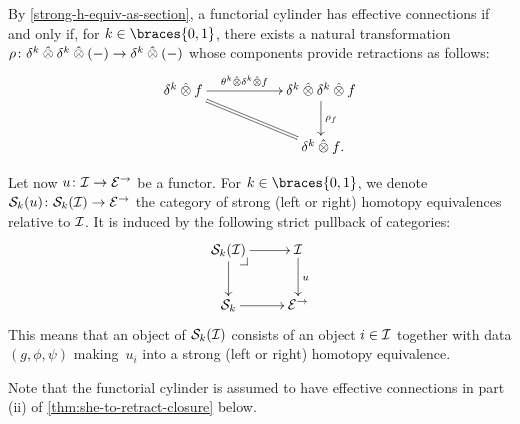 \documentclass[reqno,10pt,a4paper,oneside]{amsart}
\begin{document}
\begin{remark} \label{thm:retraction-for-connections}
By \cref{strong-h-equiv-as-section}, a functorial cylinder has effective connections if and only if, for $k \in \braces{0, 1}$, there exists a natural transformation $\rho \co \kcyl \hatotimes \kcyl \hatotimes (-) \to \kcyl \hatotimes (-)$ whose components provide retractions as follows:
\begin{gather*}
\xymatrix@C+3em{
  \kcyl \hatotimes f
  \ar[r]^-{\thetak \hatotimes \kcyl \hatotimes f}
  \ar@{=}[dr]
&
  \kcyl \hatotimes \kcyl \hatotimes f
  \ar[d]^{\rho_f}
\\&
  \kcyl \hatotimes f
\rlap{.}}
\end{gather*}
\end{remark}


Let now $u \co \cal{I} \to \catE^\to$ be a functor.
For $k \in \braces{0, 1}$, we denote $\cal{S}_k(u) \co \cal{S}_k(\cal{I}) \to \catE^\to$ the category of strong (left or right) homotopy equivalences relative to $\cal{I}$.
It is induced by the following strict pullback of categories:
\[
\xymatrix{
  \cal{S}_k(\cal{I})
  \ar[r]
  \ar[d]
  \pullback{dr}
&
  \cal{I}
  \ar[d]^{u}
\\
  \cal{S}_k
  \ar[r]
&
  \catE^\to
}
\]
This means that an object of $\cal{S}_k(\cal{I})$ consists of an object $i \in \cal{I}$ together with data $(g, \phi, \psi)$ making~$u_i$ into a strong (left or right) homotopy equivalence.

\medskip

Note that the functorial cylinder is assumed to have effective connections in part (ii) of \cref{thm:she-to-retract-closure} below.
\end{document}
